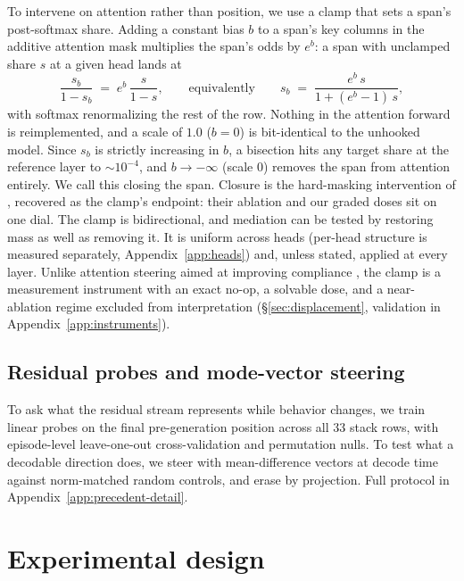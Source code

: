 \documentclass{article}
\begin{document}
To intervene on attention rather than position, we use a clamp that sets a span's
post-softmax share. Adding a constant bias $b$ to a span's key columns in the additive
attention mask multiplies the span's odds by $e^{b}$: a span with unclamped share $s$ at a
given head lands at
\[
  \frac{s_b}{1-s_b} \;=\; e^{b}\,\frac{s}{1-s},
  \qquad\text{equivalently}\qquad
  s_b \;=\; \frac{e^{b}\,s}{1+(e^{b}-1)\,s},
\]
with softmax renormalizing the rest of the row. Nothing in the
attention forward is reimplemented, and a scale of $1.0$ ($b{=}0$) is bit-identical to the
unhooked model. Since $s_b$ is strictly increasing in $b$, a bisection hits any target share
at the reference layer to ${\sim}10^{-4}$, and $b\to-\infty$ (scale $0$) removes the span from
attention entirely. We call this closing the span. Closure is the hard-masking intervention of
\citet{dongre2026attentioncloses}, recovered as the clamp's endpoint: their ablation and our
graded doses sit on one dial. The clamp is bidirectional, and mediation can be tested by
restoring mass as well as removing it. It is uniform across heads (per-head structure is
measured separately, Appendix~\ref{app:heads}) and, unless stated, applied at every layer.
Unlike attention steering aimed at improving compliance \citep{zhang2023pasta}, the clamp is a
measurement instrument with an exact no-op, a solvable dose, and a near-ablation regime
excluded from interpretation (\S\ref{sec:displacement}, validation in
Appendix~\ref{app:instruments}).

\subsection{Residual probes and mode-vector steering}
\label{sec:probes}

To ask what the residual stream represents while behavior changes, we train linear probes
\citep{alain2016probes,belinkov2022probing} on the final pre-generation position across all 33
stack rows, with episode-level leave-one-out cross-validation and permutation nulls. To test
what a decodable direction does, we steer with mean-difference vectors at decode time
against norm-matched random controls, and erase by projection. Full protocol in
Appendix~\ref{app:precedent-detail}.

\section{Experimental design}
\label{sec:design}
\end{document}
